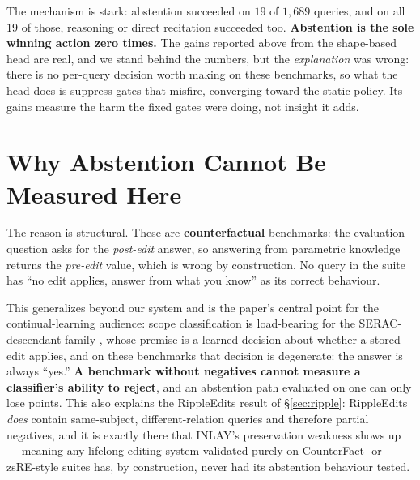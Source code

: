 \documentclass{article}
\begin{document}
The mechanism is stark: abstention succeeded on $19$ of $1{,}689$ queries,
and on all $19$ of those, reasoning or direct recitation succeeded too.
\textbf{Abstention is the sole winning action zero times.} The gains
reported above from the shape-based head are real, and we stand behind the
numbers, but the \emph{explanation} was wrong: there is no per-query
decision worth making on these benchmarks, so what the head does is
suppress gates that misfire, converging toward the static policy. Its gains
measure the harm the fixed gates were doing, not insight it adds.

\section{Why Abstention Cannot Be Measured Here}
\label{sec:cannot-measure}

The reason is structural. These are \textbf{counterfactual} benchmarks: the
evaluation question asks for the \emph{post-edit} answer, so answering from
parametric knowledge returns the \emph{pre-edit} value, which is wrong by
construction. No query in the suite has ``no edit applies, answer from what
you know'' as its correct behaviour.

This generalizes beyond our system and is the paper's central point for the
continual-learning audience: scope classification is load-bearing for the
SERAC-descendant family \citep{mitchell2022serac}, whose premise is a
learned decision about whether a stored edit applies, and on these
benchmarks that decision is degenerate: the answer is always ``yes.''
\textbf{A benchmark without negatives cannot measure a classifier's
ability to reject}, and an abstention path evaluated on one can only lose
points. This also explains the RippleEdits result of \S\ref{sec:ripple}:
RippleEdits \emph{does} contain same-subject, different-relation queries
and therefore partial negatives, and it is exactly there that INLAY's
preservation weakness shows up --- meaning any lifelong-editing system
validated purely on CounterFact- or zsRE-style suites has, by construction,
never had its abstention behaviour tested.
\end{document}
